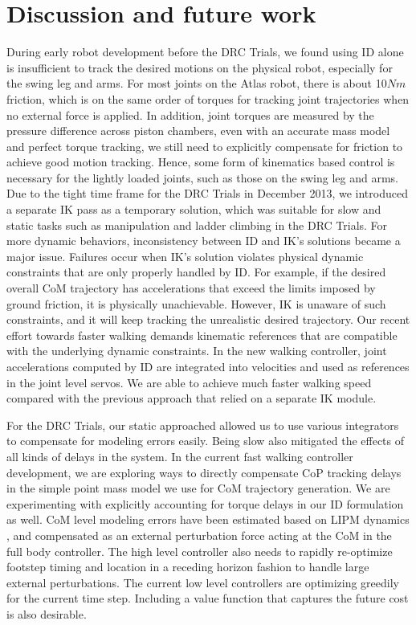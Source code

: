 \documentclass{ws-ijhr}
\begin{document}
\section{Discussion and future work}
\label{sec:dis}
During early robot development before the DRC Trials, we found using ID alone is 
insufficient to track the desired motions on the physical robot, especially 
for the swing leg and arms. 
For most joints on the Atlas robot, there is about 10$Nm$ friction, which is
on the same order of torques for tracking joint trajectories when no external
force is applied.
In addition, joint torques are measured by the pressure difference across piston 
chambers, even with an accurate mass model and perfect torque tracking, we still
need to explicitly compensate for friction to achieve good motion tracking.
Hence, some form of kinematics based control is necessary for the lightly loaded
joints, such as those on the swing leg and arms.
Due to the tight time frame for the DRC Trials in December 2013, we introduced
a separate IK pass as a temporary solution, which was suitable for slow and
static tasks such as manipulation and ladder climbing in the DRC Trials. 
For more dynamic behaviors, inconsistency between ID and IK's solutions became 
a major issue. 
Failures occur when IK's solution violates physical dynamic constraints that are 
only properly handled by ID. 
For example, if the desired overall CoM trajectory has accelerations that 
exceed the limits imposed by ground friction, it is physically unachievable. 
However, IK is unaware of such constraints, and it will keep tracking the 
unrealistic desired trajectory. 
Our recent effort towards faster walking demands kinematic references that are 
compatible with the underlying dynamic constraints. 
In the new walking controller, joint accelerations computed by ID are 
integrated into velocities and used as references in the joint level servos. 
We are able to achieve much faster walking speed compared with the previous 
approach that relied on a separate IK module. 

For the DRC Trials, our static approached allowed us to use various integrators to 
compensate for modeling errors easily. 
Being slow also mitigated the effects of all kinds of delays in the system. 
In the current fast walking controller development, we are exploring ways to 
directly compensate CoP tracking delays in the simple point mass model we use 
for CoM trajectory generation. 
We are experimenting with explicitly accounting for torque delays in our ID
formulation as well.  
CoM level modeling errors have been estimated based on LIPM 
dynamics \cite{benx_proposal}, and compensated as an external perturbation 
force acting at the CoM \cite{sfeng_proposal} in the full body controller.
The high level controller also needs to rapidly re-optimize footstep timing and
location in a receding horizon fashion to handle large external perturbations. 
The current low level controllers are optimizing greedily for the current 
time step. 
Including a value function \cite{scott_qp} that captures the future cost is 
also desirable. 
\end{document}
